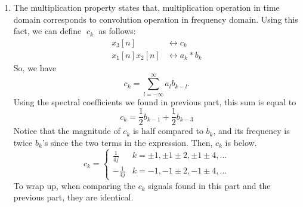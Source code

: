 \documentclass[10pt,a4paper, margin=1in]{article}
\begin{document}
\begin{enumerate}
\begin{enumerate}
    \item %
    The multiplication property states that, multiplication operation in time domain corresponds to convolution operation in frequency domain. Using this fact, we can define $\; c_k \;$ as follows:
        \begin{align*}
            x_3[n] &\leftrightarrow c_k \\
            x_1[n]x_2[n] &\leftrightarrow a_k * b_k
        \end{align*}
    So, we have
    $$c_k = \sum_{l=-\infty}^{\infty}a_lb_{k-l}.$$
    Using the spectral coefficients we found in previous part, this sum is equal to
    $$c_k=\frac{1}{2}b_{k-1}+\frac{1}{2}b_{k-3}$$
     Notice that the magnitude of $c_k$ is half compared to $b_k$, and its frequency is twice $b_k$'s since the two terms in the expression. Then, $c_k$ is below.
    $$c_k = 
        \begin{cases}
            \frac{1}{4j} & k=\pm 1, \pm 1 \pm 2, \pm 1 \pm 4, ...\\
            -\frac{1}{4j} & k=-1, -1 \pm 2, -1 \pm 4, ...
        \end{cases}
    $$
    To wrap up, when comparing the $c_k$ signals found in this part and the previous part, they are identical.
    \end{enumerate}\vspace{0.3cm}


\end{enumerate}
\end{document}
